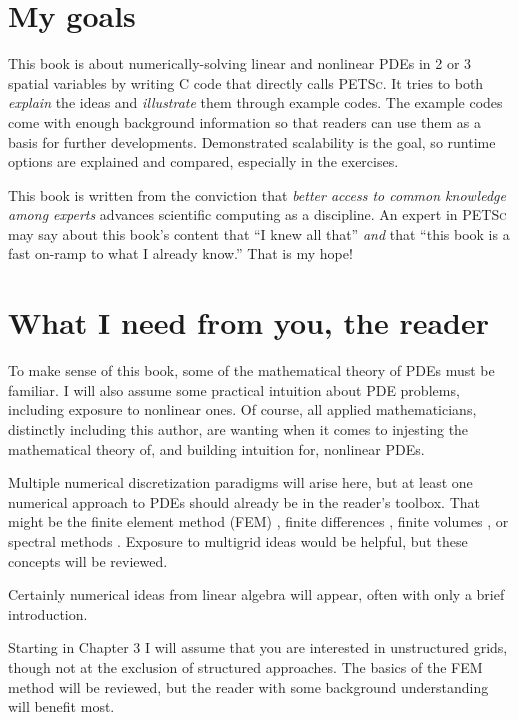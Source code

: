 \documentclass{tufte-book}
\theoremstyle{definition}
\newcommand{\PETSc}{\textsc{PETSc}\xspace}
\begin{document}
\section{My goals}

This book is about numerically-solving linear and nonlinear PDEs in 2 or 3 spatial variables by writing C code that directly calls \PETSc.  It tries to both \emph{explain} the ideas and \emph{illustrate} them through example codes.  The example codes come with enough background information so that readers can use them as a basis for further developments.  Demonstrated scalability is the goal, so runtime options are explained and compared, especially in the exercises.

This book is written from the conviction that \emph{better access to common knowledge among experts} advances scientific computing as a discipline.  An expert in \PETSc may say about this book's content that ``I knew all that'' \emph{and} that ``this book is a fast on-ramp to what I already know.''  That is my hope!

\section{What I need from you, the reader}

To make sense of this book, some of the mathematical theory of PDEs must be familiar.  I will also assume some practical intuition about PDE problems, including exposure to nonlinear ones.  Of course, all applied mathematicians, distinctly including this author, are wanting when it comes to injesting the mathematical theory of, and building intuition for, nonlinear PDEs.

Multiple numerical discretization paradigms will arise here, but at least one numerical approach to PDEs should already be in the reader's toolbox.  That might be the finite element method (FEM) \citep{Braess,Elmanetal2005}, finite differences \citep{MortonMayers}, finite volumes \citep{LeVeque}, or spectral methods \citep{KarniadakisSherwin,Trefethen}.  Exposure to multigrid ideas \citep{Briggsetal2000} would be helpful, but these concepts will be reviewed.

Certainly numerical ideas from linear algebra \citep{Greenbaum1997,TrefethenBau} will appear, often with only a brief introduction.

Starting in Chapter 3 I will assume that you are interested in unstructured grids, though not at the exclusion of structured approaches.  The basics of the FEM method will be reviewed, but the reader with some background understanding will benefit most.
\end{document}
